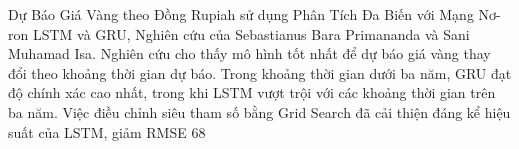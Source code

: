 Dự Báo Giá Vàng theo Đồng Rupiah sử dụng Phân Tích Đa Biến với Mạng Nơ-ron LSTM và GRU\cite{article4}, Nghiên cứu của Sebastianus Bara Primananda và Sani Muhamad Isa. Nghiên cứu cho thấy mô hình tốt nhất để dự báo giá vàng thay đổi theo khoảng thời gian dự báo. Trong khoảng thời gian dưới ba năm, GRU đạt độ chính xác cao nhất, trong khi LSTM vượt trội với các khoảng thời gian trên ba năm. Việc điều chỉnh siêu tham số bằng Grid Search đã cải thiện đáng kể hiệu suất của LSTM, giảm RMSE 68%